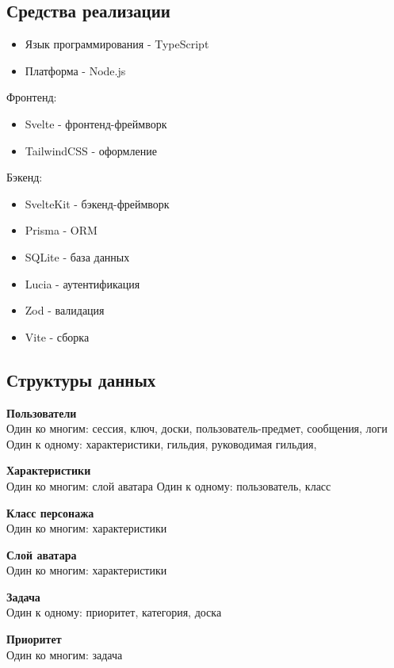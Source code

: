 \documentclass[../document.tex]{subfiles}
\begin{document}
\subsection{Средства реализации}
\begin{itemize}
  \item Язык программирования - TypeScript
  \item Платформа - Node.js
\end{itemize}
\par Фронтенд:
\begin{itemize}
  \item Svelte - фронтенд-фреймворк
  \item TailwindCSS - оформление
\end{itemize}
\par Бэкенд:
\begin{itemize}
  \item SvelteKit - бэкенд-фреймворк
  \item Prisma - ORM
  \item SQLite - база данных
  \item Lucia - аутентификация
  \item Zod - валидация
  \item Vite - сборка
\end{itemize}
\subsection{Структуры данных}
\par \textbf{Пользователи}\\
Один ко многим: сессия, ключ, доски, пользователь-предмет, сообщения, логи
Один к одному: характеристики, гильдия, руководимая гильдия,

\par \textbf{Характеристики}\\
Один ко многим: слой аватара
Один к одному: пользователь, класс

\par \textbf{Класс персонажа}\\
Один ко многим: характеристики

\par \textbf{Слой аватара}\\
Один ко многим: характеристики

\par \textbf{Задача}\\
Один к одному: приоритет, категория, доска

\par \textbf{Приоритет}\\
Один ко многим: задача
\end{document}
